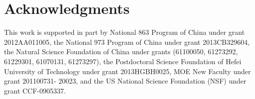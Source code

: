 \documentclass{sig-alternate-2013}%
\begin{document}
\section{Acknowledgments}
This work is supported in part by National 863 Program of China under grant 2012AA011005, the National 973 Program of China under grant
2013CB329604, the Natural Science Foundation of China under grants (61100050, 61273292, 61229301, 61070131, 61273297), the Postdoctoral Science
Foundation of Hefei University of Technology under grant 2013HGBH0025, MOE New Faculty under grant 201100731- 20023, and the US National Science Foundation (NSF) under grant
CCF-0905337.
%
%

%
%
\end{document}
